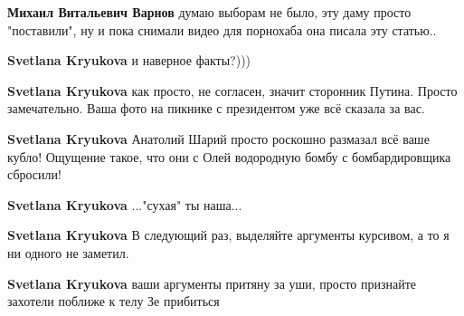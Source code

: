 \begin{itemize}
\begin{itemize}
\textbf{Михаил Витальевич Варнов} думаю выборам не было, эту даму просто "поставили", ну и пока снимали видео для порнохаба она писала эту статью..

 
\textbf{Svetlana Kryukova} и наверное факты?)))

 
\textbf{Svetlana Kryukova} как просто, не согласен, значит сторонник Путина. Просто замечательно. Ваша фото на пикнике с президентом уже всё сказала за вас.

 
\textbf{Svetlana Kryukova} Анатолий Шарий просто роскошно размазал всё ваше кубло! Ощущение такое, что они с Олей водородную бомбу с бомбардировщика сбросили!

 
\textbf{Svetlana Kryukova} ..."сухая" ты наша...

 
\textbf{Svetlana Kryukova} В следующий раз, выделяйте аргументы курсивом, а то я ни одного не заметил.

 
\textbf{Svetlana Kryukova} ваши аргументы притяну за уши, просто признайте захотели поближе к телу Зе прибиться


\end{itemize}
\end{itemize}
